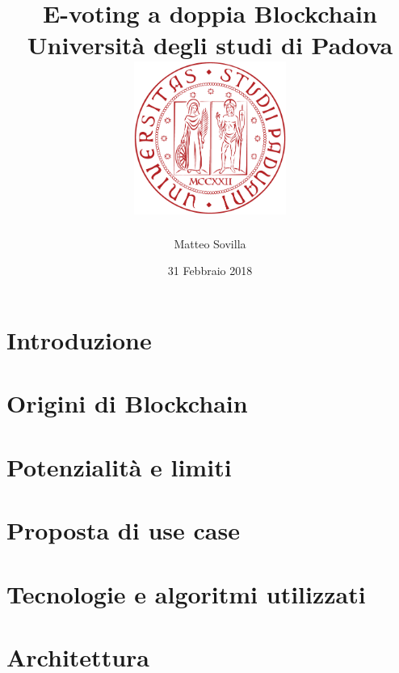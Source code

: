 \documentclass[12pt,twoside]{report}
\title{
	{E-voting a doppia Blockchain}\\
	{\large Università degli studi di Padova}\\
	{\includegraphics[width=5cm]{logo_unipd.eps}}
}
\author{Matteo Sovilla}
\date{31 Febbraio 2018}
\begin{document}
%





\tableofcontents
\listoffigures

\chapter{Introduzione}


\chapter{Origini di Blockchain}


\chapter{Potenzialità e limiti}


\chapter{Proposta di use case}


\chapter{Tecnologie e algoritmi utilizzati}


\chapter{Architettura}

\end{document}
